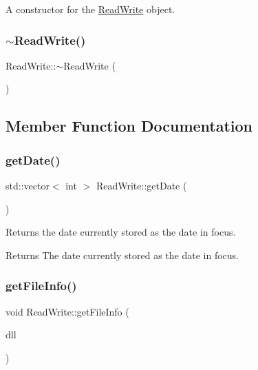 A constructor for the \hyperlink{class_read_write}{Read\+Write} object. 

\hypertarget{class_read_write_a3ba4e7d0b1aba13ab9b7a72898fa94a7}{}\label{class_read_write_a3ba4e7d0b1aba13ab9b7a72898fa94a7} 
\subsubsection{\texorpdfstring{$\sim$\+Read\+Write()}{~ReadWrite()}}
{\footnotesize\ttfamily Read\+Write\+::$\sim$\+Read\+Write (\begin{DoxyParamCaption}{ }\end{DoxyParamCaption})}



\subsection{Member Function Documentation}
\hypertarget{class_read_write_af7557737b9043d9e605473c7e6984046}{}\label{class_read_write_af7557737b9043d9e605473c7e6984046} 
\subsubsection{\texorpdfstring{get\+Date()}{getDate()}}
{\footnotesize\ttfamily std\+::vector$<$ int $>$ Read\+Write\+::get\+Date (\begin{DoxyParamCaption}{ }\end{DoxyParamCaption})}



Returns the date currently stored as the date in focus. 

\begin{DoxyReturn}{Returns}
The date currently stored as the date in focus. 
\end{DoxyReturn}
\hypertarget{class_read_write_a778d106489a4f41730d902d338ec3937}{}\label{class_read_write_a778d106489a4f41730d902d338ec3937} 
\subsubsection{\texorpdfstring{get\+File\+Info()}{getFileInfo()}}
{\footnotesize\ttfamily void Read\+Write\+::get\+File\+Info (\begin{DoxyParamCaption}\item[{\hyperlink{class_double_linked_list}{Double\+Linked\+List} $\ast$}]{dll }\end{DoxyParamCaption})}




